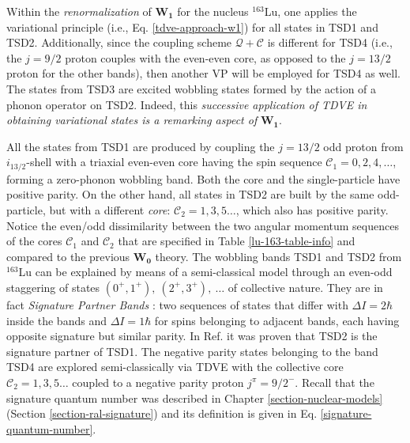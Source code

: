 Within the \emph{renormalization} of $\mathbf{W_1}$ for the nucleus $^{163}$Lu, one applies the variational principle (i.e., Eq. \ref{tdve-approach-w1}) for all states in TSD1 and TSD2. Additionally, since the coupling scheme $\mathcal{Q}+\mathscr{C}$ is different for TSD4 (i.e., the $j=9/2$ proton couples with the even-even core, as opposed to the $j=13/2$ proton for the other bands), then another VP will be employed for TSD4 as well. The states from TSD3 are excited wobbling states formed by the action of a phonon operator on TSD2. Indeed, this \emph{successive application of TDVE in obtaining variational states is a remarking aspect of} $\mathbf{W_1}$.

All the states from TSD1 are produced by coupling the $j=13/2$ odd proton from $i_{13/2}$-shell with a triaxial even-even core having the spin sequence $\mathscr{C}_1=0,2,4,\dots$, forming a zero-phonon wobbling band. Both the core and the single-particle have positive parity. On the other hand, all states in TSD2 are built by the same odd-particle, but with a different \emph{core}: $\mathscr{C}_2=1,3,5\dots$, which also has positive parity. Notice the even/odd dissimilarity between the two angular momentum sequences of the cores $\mathscr{C}_1$ and $\mathscr{C}_2$ that are specified in Table \ref{lu-163-table-info} and compared to the previous $\mathbf{W_0}$ theory. The wobbling bands TSD1 and TSD2 from $^{163}$Lu can be explained by means of a semi-classical model through an even-odd staggering of states $(0^+,1^+),\ (2^+,3^+),\ \dots$ of collective nature. They are in fact \emph{Signature Partner Bands} \cite{raduta2020approach}: two sequences of states that differ with $\Delta I=2\hbar$ inside the bands and $\Delta I=1\hbar$ for spins belonging to adjacent bands, each having opposite signature but similar parity. In Ref. \cite{raduta2020towards} it was proven that TSD2 is the signature partner of TSD1. The negative parity states belonging to the band TSD4 are explored semi-classically via TDVE with the collective core $\mathscr{C}_2=1,3,5\dots$ coupled to a negative parity proton $j^\pi=9/2^-$. Recall that the signature quantum number was described in Chapter \ref{section-nuclear-models} (Section \ref{section-ral-signature}) and its definition is given in Eq. \ref{signature-quantum-number}.


